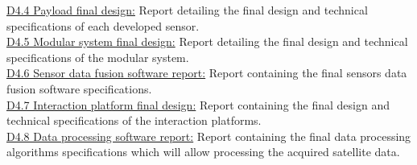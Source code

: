 \begin{longtable}
{{		 \underline{D4.4 Payload final design:} Report detailing the final design and technical specifications of
each developed sensor.\\

		 \underline{D4.5 Modular system final design:} Report detailing the final design and technical specifications of
the modular system.\\

		 \underline{D4.6 Sensor data fusion software report:} Report containing the final sensors data fusion software
specifications.\\

		 \underline{D4.7 Interaction platform final design:} Report containing the final design and technical specifications
of the interaction platforms.\\

		 \underline{D4.8 Data processing software report:} Report containing the final data processing algorithms
specifications which will allow processing the acquired satellite
data.\\

		 
		 
		 }}\\
		 
		 \hline 
		 
		
		\caption{WP4 description}
		
\end{longtable}


